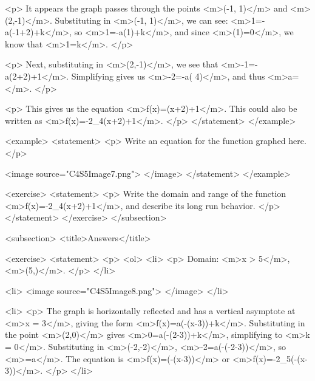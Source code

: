                 <p>
                    It appears the graph passes through the points <m>(-1, 1)</m> and <m>(2,-1)</m>.
                    Substituting in <m>(-1, 1)</m>, we can see: <m>1=-a\log(-1+2)+k</m>, so <m>1=-a\log(1)+k</m>, and since <m>\log(1)=0</m>, we know that <m>1=k</m>.
                </p>

                <p>
                    Next, substituting in <m>(2,-1)</m>, we see that <m>-1=-a\log(2+2)+1</m>.
                    Simplifying gives us <m>-2=-a\log( 4)</m>, and thus <m>a=</m>.
                </p>

                <p>
                    This gives us the equation <m>f(x)=\log(x+2)+1</m>.
                    This could also be written as <m>f(x)=-2\log_{4}(x+2)+1</m>.
                </p>
            </statement>
        </example>

        <example>
            <statement>
                <p>
                    Write an equation for the function graphed here.
                </p>

                <image source="C4S5Image7.png">
                </image>
            </statement>
        </example>

        <exercise>
            <statement>
                <p>
                    Write the domain and range of the function <m>f(x)=-2\log_{4}(x+2)+1</m>, and describe its long run behavior.
                </p>
            </statement>
        </exercise>
    </subsection>


    <subsection>
        <title>Answers</title>

        <exercise>
            <statement>
                <p>
                    <ol>
                        <li>
                            <p>
                                Domain: <m>x > 5</m>, <m>(5,\infty)</m>.
                            </p>
                        </li>

                        <li>
                            <image source="C4S5Image8.png">
                            </image>
                        </li>

                        <li>
                            <p>
                                The graph is horizontally reflected and has a vertical asymptote at <m>x = 3</m>, giving the form <m>f(x)=a\log(-(x-3))+k</m>.
                                Substituting in the point <m>(2,0)</m> gives <m>0=a\log(-(2-3))+k</m>, simplifying to <m>k = 0</m>.
                                Substituting in <m>(-2,-2)</m>, <m>-2=a\log(-(-2-3))</m>, so <m>=a</m>.
                                The equation is <m>f(x)=\log(-(x-3))</m> or <m>f(x)=-2\log_{5}(-(x-3))</m>.
                            </p>
                        </li>

